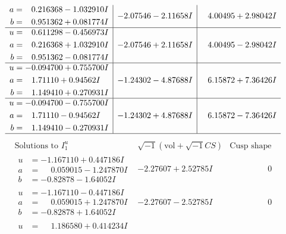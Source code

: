 \documentclass[1p]{elsarticle_modified}
\theoremstyle{definition}
\newcommand{\I}{\sqrt{-1}}
\begin{document}
$$\begin{array}{c|c|c}
\begin{aligned}
a &= \phantom{-}0.216368 - 1.032910 I \\
b &= \phantom{-}0.951362 + 0.081774 I\end{aligned}
 & -2.07546 - 2.11658 I & \phantom{-}4.00495 + 2.98042 I \\ \hline\begin{aligned}
u &= \phantom{-}0.611298 - 0.456973 I \\
a &= \phantom{-}0.216368 + 1.032910 I \\
b &= \phantom{-}0.951362 - 0.081774 I\end{aligned}
 & -2.07546 + 2.11658 I & \phantom{-}4.00495 - 2.98042 I \\ \hline\begin{aligned}
u &= -0.094700 + 0.755700 I \\
a &= \phantom{-}1.71110 + 0.94562 I \\
b &= \phantom{-}1.149410 + 0.270931 I\end{aligned}
 & -1.24302 - 4.87688 I & \phantom{-}6.15872 + 7.36426 I \\ \hline\begin{aligned}
u &= -0.094700 - 0.755700 I \\
a &= \phantom{-}1.71110 - 0.94562 I \\
b &= \phantom{-}1.149410 - 0.270931 I\end{aligned}
 & -1.24302 + 4.87688 I & \phantom{-}6.15872 - 7.36426 I\\
 \hline 
 \end{array}$$\newpage$$\begin{array}{c|c|c}  
\text{Solutions to }I^u_{1}& \I (\text{vol} + \sqrt{-1}CS) & \text{Cusp shape}\\
 \hline 
\begin{aligned}
u &= -1.167110 + 0.447186 I \\
a &= \phantom{-}0.059015 - 1.247870 I \\
b &= -0.82878 - 1.64052 I\end{aligned}
 & -2.27607 + 2.52785 I & \phantom{-0.000000 } 0 \\ \hline\begin{aligned}
u &= -1.167110 - 0.447186 I \\
a &= \phantom{-}0.059015 + 1.247870 I \\
b &= -0.82878 + 1.64052 I\end{aligned}
 & -2.27607 - 2.52785 I & \phantom{-0.000000 } 0 \\ \hline\begin{aligned}
u &= \phantom{-}1.186580 + 0.414234 I \\

\end{aligned}
\end{array}$$
\end{document}

